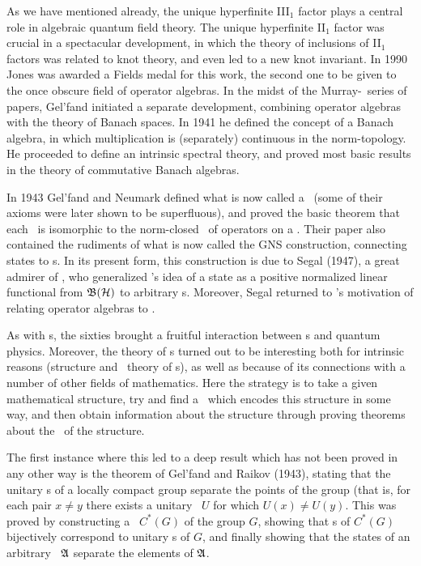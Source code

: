 As we have mentioned already, the unique hyperfinite III$\mbox{}_1$
factor plays a central role in algebraic quantum field theory. The
unique hyperfinite II$\mbox{}_1$ factor was crucial in a spectacular
development, in which the theory of inclusions of II$\mbox{}_1$
factors was related to knot theory, and even led to a new knot
invariant. In 1990 Jones was awarded a Fields medal for this work, the
second one to be given to the once obscure field of operator algebras.
 In the midst of the Murray-\vN\ series of papers,
Gel'fand initiated a separate development, combining operator algebras
with the theory of Banach spaces. In 1941 he defined the concept of a
Banach algebra, in which multiplication is (separately) continuous in
the norm-topology.  He proceeded to define an intrinsic spectral
theory, and proved most basic results in the theory of commutative
Banach algebras.

In 1943 Gel'fand and Neumark defined what is now called a \ca\ (some
of their axioms were later shown to be superfluous), and proved the
basic theorem that each \ca\ is isomorphic to the norm-closed \sta\ of
operators on a \Hs.  Their paper also contained the rudiments of what
is now called the GNS construction, connecting states to \rep s. In
its present form, this construction is due to Segal (1947), a great
admirer of \vN, who generalized \vN's idea of a state as a positive
normalized linear functional from ${\frak B}({\cal H})$ to arbitrary \ca s. Moreover,
Segal returned to \vN's motivation of relating operator algebras to
\qm.

As with \vNa s, the sixties brought a fruitful interaction between \ca
s and quantum physics.  Moreover, the theory of \ca s turned out to be
interesting both for intrinsic reasons (structure and \rep\ theory of
\ca s), as well as because of its connections with a number of other
fields of mathematics.  Here the strategy is to take a given
mathematical structure, try and find a \ca\ which encodes this
structure in some way, and then obtain information about the structure
through proving theorems about the \ca\ of the structure.

The first instance where this led to a deep result which has not been
proved in any other way is the theorem of Gel'fand and Raikov (1943),
stating that the unitary \rep s of a locally compact group separate
the points of the group (that is, for each pair $x\neq y$ there exists
a unitary \rep\ $U$ for which $U(x)\neq U(y)$. This was proved by
constructing a \ca\ $C^*(G)$ of the group $G$, showing that \rep s of
$C^*(G)$ bijectively correspond to unitary \rep s of $G$, and finally
showing that the states of an arbitrary \ca\ ${\frak A}$ separate the
elements of ${\frak A}$.

